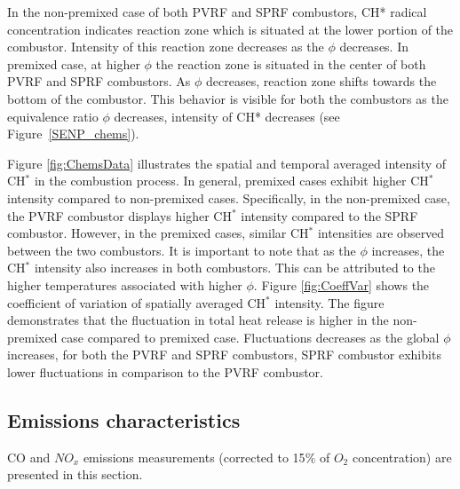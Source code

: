 In the non-premixed case of both PVRF and SPRF combustors, CH* radical concentration indicates reaction zone which is situated at the lower portion of the combustor. Intensity of this reaction zone decreases as the $\phi$ decreases. In premixed case, at higher $\phi$ the reaction zone is situated in the center of both PVRF and SPRF combustors. As $\phi$ decreases, reaction zone shifts towards the bottom of the combustor. This behavior is visible for both the combustors  as the equivalence ratio $\phi$ decreases, intensity of CH* decreases (see Figure~\ref{SENP_chems}).

Figure \ref{fig:ChemsData} illustrates the spatial and temporal averaged intensity of CH$^*$ in the combustion process. In general, premixed cases exhibit higher CH$^*$ intensity compared to non-premixed cases. Specifically, in the non-premixed case, the PVRF combustor displays higher CH$^*$ intensity compared to the SPRF combustor. However, in the premixed cases, similar CH$^*$ intensities are observed between the two combustors. It is important to note that as the $\phi$ increases, the CH$^*$ intensity also increases in both combustors. This can be attributed to the higher temperatures associated with higher $\phi$. Figure \ref{fig:CoeffVar} shows the coefficient of variation of spatially averaged CH$^*$ intensity. The figure demonstrates that the fluctuation in total heat release is higher in the non-premixed case compared to premixed case. Fluctuations decreases as the global $\phi$ increases, for both the PVRF and SPRF combustors, SPRF combustor exhibits lower fluctuations in comparison to the PVRF combustor.

\subsection{Emissions characteristics}
CO and $NO_x$ emissions measurements (corrected to 15$\%$ of $O_2$ concentration) are presented in this section. 
